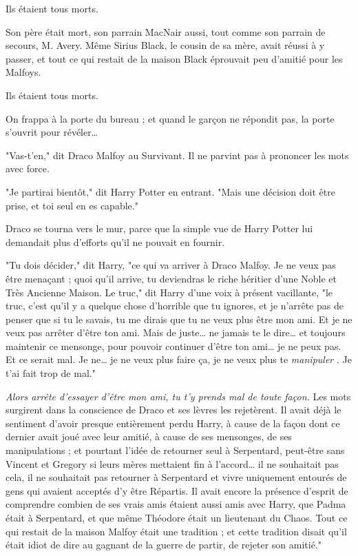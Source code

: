Ils étaient tous morts.

Son père était mort, son parrain MacNair aussi, tout comme son parrain de secours, M. Avery. Même Sirius Black, le cousin de sa mère, avait réussi à y passer, et tout ce qui restait de la maison Black éprouvait peu d'amitié pour les Malfoys.

Ils étaient tous morts.

On frappa à la porte du bureau ; et quand le garçon ne répondit pas, la porte s'ouvrit pour révéler…

"Vas-t'en," dit Draco Malfoy au Survivant. Il ne parvint pas à prononcer les mots avec force.

"Je partirai bientôt," dit Harry Potter en entrant. "Mais une décision doit être prise, et toi seul en es capable."

Draco se tourna vers le mur, parce que la simple vue de Harry Potter lui demandait plus d'efforts qu'il ne pouvait en fournir.

"Tu dois décider," dit Harry, "ce qui va arriver à Draco Malfoy. Je ne veux pas être menaçant ; quoi qu'il arrive, tu deviendras le riche héritier d'une Noble et Très Ancienne Maison. Le truc," dit Harry d'une voix à présent vacillante, "le truc, c'est qu'il y a quelque chose d'horrible que tu ignores, et je n'arrête pas de penser que si tu le savais, tu me dirais que tu ne veux plus être mon ami. Et je ne veux pas arrêter d'être ton ami. Mais de juste… ne jamais te le dire… et toujours maintenir ce mensonge, pour pouvoir continuer d'être ton ami… je ne peux pas. Et ce serait mal. Je ne… je ne veux plus faire ça, je ne veux plus te \emph{manipuler} . Je t'ai fait trop de mal."

\emph{Alors arrête d'essayer d'être mon ami, tu t'y prends mal de toute façon.}  Les mots surgirent dans la conscience de Draco et ses lèvres les rejetèrent. Il avait déjà le sentiment d'avoir presque entièrement perdu Harry, à cause de la façon dont ce dernier avait joué avec leur amitié, à cause de ses mensonges, de ses manipulations ; et pourtant l'idée de retourner seul à Serpentard, peut-être sans Vincent et Gregory si leurs mères mettaient fin à l'accord… il ne souhaitait pas cela, il ne souhaitait pas retourner à Serpentard et vivre uniquement entourés de gens qui avaient acceptés d'y être Répartis. Il avait encore la présence d'esprit de comprendre combien de ses vrais amis étaient aussi amis avec Harry, que Padma était à Serpentard, et que même Théodore était un lieutenant du Chaos. Tout ce qui restait de la maison Malfoy était une tradition ; et cette tradition disait qu'il était idiot de dire au gagnant de la guerre de partir, de rejeter son amitié."

